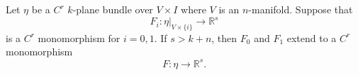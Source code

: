 Let $\eta$ be a $C^r$ $k$-plane bundle over $V \times I$ where $V$ is an $n$-manifold. Suppose that
$$F_i: \eta|_{V \times \{i\}} \to \mathbb{R}^s$$
is a $C^r$ monomorphism for $i = 0, 1$. If $s > k + n$, then $F_0$ and $F_1$ extend to a $C^r$ monomorphism
$$F: \eta \to \mathbb{R}^s.$$

